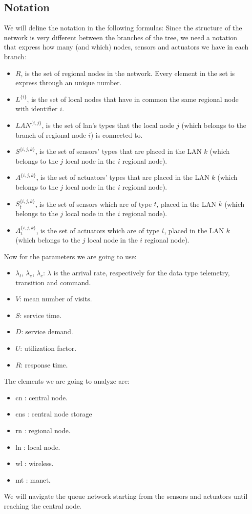 \documentclass[11pt]{article}
\begin{document}
\subsection{Notation}
We will deline the notation in the following formulas:
Since the structure of the network is very different between the branches of the tree, we need a notation that express how many (and which) nodes, sensors and actuators we have in each branch:
\begin{itemize}
\item $R$, is the set of regional nodes in the network. Every element in the set is express through an unique number.
\item $L^{\{i\}}$, is the set of local nodes that have in common the same regional node with identifier $i$.
\item $LAN^{\{i,j\}}$, is the set of lan's types that the local node $j$ (which belongs to the branch of regional node $i$) is connected to.
\item $S^{\{i,j,k\}}$, is the set of sensors' types that are placed in the LAN $k$ (which belongs to the $j$ local node in the $i$ regional node).
\item $A^{\{i,j,k\}}$, is the set of actuators' types that are placed in the LAN $k$ (which belongs to the $j$ local node in the $i$ regional node).
\item $S^{\{i,j,k\}}_{t}$, is the set of sensors which are of type $t$, placed in the LAN $k$ (which belongs to the $j$ local node in the $i$ regional node).
\item $A^{\{i,j,k\}}_{t}$, is the set of actuators which are of type $t$, placed in the LAN $k$ (which belongs to the $j$ local node in the $i$ regional node).
\end{itemize}
Now for the parameters we are going to use:
\begin{itemize}
\item $\lambda_t$, $\lambda_e$, $\lambda_c$: $\lambda$ is the arrival rate, respectively for the data type telemetry, transition and command.
\item $V$: mean number of visits.
\item $S$: service time.
\item $D$: service demand.
\item $U$: utilization factor.
\item $R$: response time.
\end{itemize}
The elements we are going to analyze are:
\begin{itemize}
\item cn : central node.
\item cns : central node storage
\item rn : regional node.
\item ln : local node.
\item wl : wireless.
\item mt : manet.
\end{itemize}
We will navigate the queue network starting from the sensors and actuators until reaching the central node.
\end{document}
